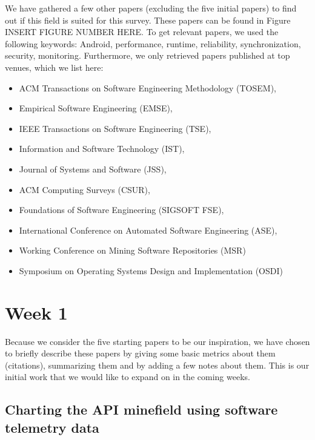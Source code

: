 \documentclass[]{book}
\providecommand{\tightlist}{%
  \setlength{\itemsep}{0pt}\setlength{\parskip}{0pt}}
\begin{document}
We have gathered a few other papers (excluding the five initial papers)
to find out if this field is suited for this survey. These papers can be
found in Figure INSERT FIGURE NUMBER HERE. To get relevant papers, we
used the following keywords: Android, performance, runtime, reliability,
synchronization, security, monitoring. Furthermore, we only retrieved
papers published at top venues, which we list here:

\begin{itemize}
\tightlist
\item
  ACM Transactions on Software Engineering Methodology (TOSEM),
\item
  Empirical Software Engineering (EMSE),
\item
  IEEE Transactions on Software Engineering (TSE),
\item
  Information and Software Technology (IST),
\item
  Journal of Systems and Software (JSS),
\item
  ACM Computing Surveys (CSUR),
\item
  Foundations of Software Engineering (SIGSOFT FSE),
\item
  International Conference on Automated Software Engineering (ASE),
\item
  Working Conference on Mining Software Repositories (MSR)
\item
  Symposium on Operating Systems Design and Implementation (OSDI)
\end{itemize}

\section{Week 1}\label{week-1}

Because we consider the five starting papers to be our inspiration, we
have chosen to briefly describe these papers by giving some basic
metrics about them (citations), summarizing them and by adding a few
notes about them. This is our initial work that we would like to expand
on in the coming weeks.

\subsection{Charting the API minefield using software telemetry
data}\label{charting-the-api-minefield-using-software-telemetry-data}
\end{document}
